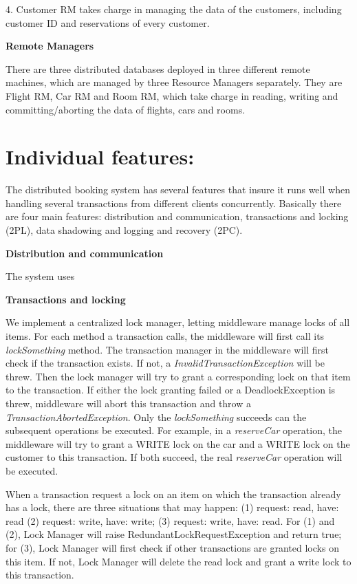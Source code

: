 \documentclass[a4paper, 12pt]{article}
\newcommand{\newQuestion}[1]{\section{#1}}
\newcommand{\newPart}[1]{\textbf{\large #1}}
\begin{document}
4. Customer RM takes charge in managing the data of the customers, including customer ID and reservations of every customer.

\newPart{Remote Managers}

There are three distributed databases deployed in three different remote machines, which are managed by three Resource Managers separately. They are Flight RM, Car RM and Room RM, which take charge in reading, writing and committing/aborting the data of flights, cars and rooms.

\newQuestion{Individual features:}

The distributed booking system has several features that insure it runs well when handling several transactions from different clients concurrently. Basically there are four main features: distribution and communication, transactions and locking (2PL), data shadowing and logging and recovery (2PC).

\newPart{Distribution and communication}

The system uses

\newPart{Transactions and locking}

We implement a centralized lock manager, letting middleware manage locks of all items. For each method a transaction calls, the middleware will first call its \textit{lockSomething} method. The transaction manager in the middleware will first check if the transaction exists. If not, a \textit{InvalidTransactionException} will be threw. Then the lock manager will try to grant a corresponding lock on that item to the transaction. If either the lock granting failed or a DeadlockException is threw, middleware will abort this transaction and throw a \textit{TransactionAbortedException}. Only the \textit{lockSomething} succeeds can the subsequent operations be executed. For example, in a \textit{reserveCar} operation, the middleware will try to grant a WRITE lock on the car and  a WRITE lock on the customer to this transaction. If both succeed, the real \textit{reserveCar} operation will be executed.

When a transaction request a lock on an item on which the transaction already has a lock, there are three situations that may happen: (1) request: read, have: read (2) request: write, have: write; (3) request: write, have: read. For (1) and (2), Lock Manager will raise RedundantLockRequestException and return true; for (3), Lock Manager will first check if other transactions are granted locks on this item. If not, Lock Manager will delete the read lock and grant a write lock to this transaction.
\end{document}
